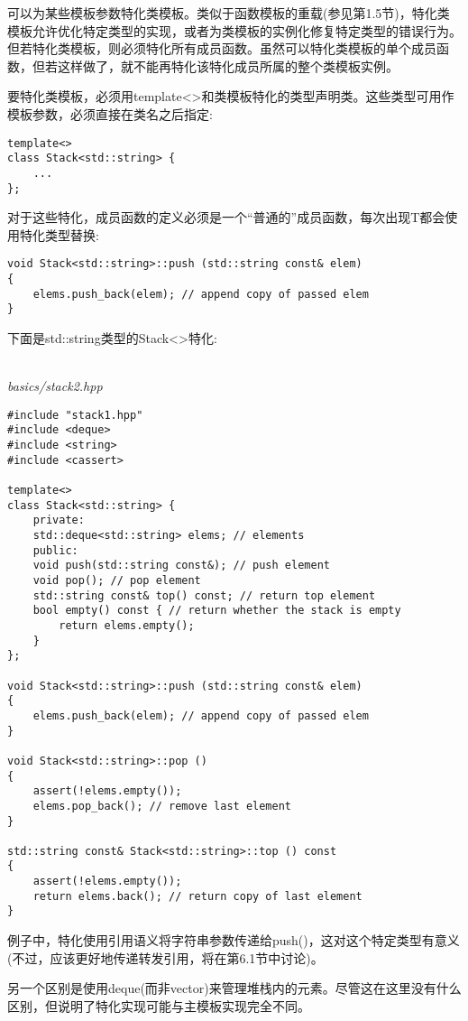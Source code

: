 可以为某些模板参数特化类模板。类似于函数模板的重载(参见第1.5节)，特化类模板允许优化特定类型的实现，或者为类模板的实例化修复特定类型的错误行为。但若特化类模板，则必须特化所有成员函数。虽然可以特化类模板的单个成员函数，但若这样做了，就不能再特化该特化成员所属的整个类模板实例。

要特化类模板，必须用template<>和类模板特化的类型声明类。这些类型可用作模板参数，必须直接在类名之后指定:

\begin{lstlisting}[style=styleCXX]
template<>
class Stack<std::string> {
	...
};
\end{lstlisting}

对于这些特化，成员函数的定义必须是一个“普通的”成员函数，每次出现T都会使用特化类型替换:

\begin{lstlisting}[style=styleCXX]
void Stack<std::string>::push (std::string const& elem)
{
	elems.push_back(elem); // append copy of passed elem
}
\end{lstlisting}

下面是std::string类型的Stack<>特化:

\hspace*{\fill} \\ %
\noindent
\textit{basics/stack2.hpp}
\begin{lstlisting}[style=styleCXX]
#include "stack1.hpp"
#include <deque>
#include <string>
#include <cassert>

template<>
class Stack<std::string> {
	private:
	std::deque<std::string> elems; // elements
	public:
	void push(std::string const&); // push element
	void pop(); // pop element
	std::string const& top() const; // return top element
	bool empty() const { // return whether the stack is empty
		return elems.empty();
	}
};

void Stack<std::string>::push (std::string const& elem)
{
	elems.push_back(elem); // append copy of passed elem
}

void Stack<std::string>::pop ()
{
	assert(!elems.empty());
	elems.pop_back(); // remove last element
}

std::string const& Stack<std::string>::top () const
{
	assert(!elems.empty());
	return elems.back(); // return copy of last element
}
\end{lstlisting}

例子中，特化使用引用语义将字符串参数传递给push()，这对这个特定类型有意义(不过，应该更好地传递转发引用，将在第6.1节中讨论)。

另一个区别是使用deque(而非vector)来管理堆栈内的元素。尽管这在这里没有什么区别，但说明了特化实现可能与主模板实现完全不同。






















